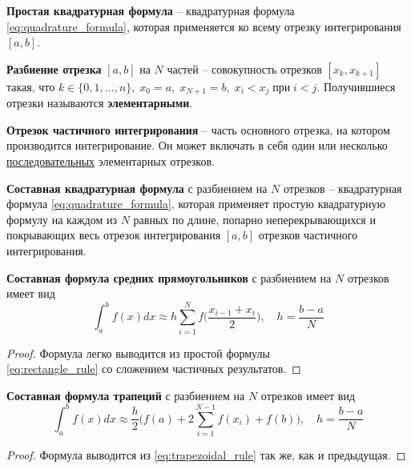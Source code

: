 \documentclass[../main.tex]{subfile}
\begin{document}
\begin{define}
	\textbf{Простая квадратурная формула} -- квадратурная формула
	\eqref{eq:quadrature_formula}, которая применяется ко всему отрезку
	интегрирования $[a,b]$.
\end{define}

\begin{define}
	\textbf{Разбиение отрезка} $[a,b]$ на $N$ частей -- совокупность
	отрезков $[x_k,x_{k+1}]$ такая, что $k\in\{0,1,...,n\},\;x_0=a,\;x_{N+1}
	=b,\;x_i<x_j\;\text{при}\;i<j$. Получившиеся отрезки называются
	\textbf{элементарными}.
\end{define}

\begin{define}
	\textbf{Отрезок частичного интегрирования} -- часть основного отрезка,
	на котором производится интегрирование. Он может включать в себя один
	или несколько \underline{последовательных} элементарных отрезков.
\end{define}

\begin{define}
	\textbf{Составная квадратурная формула} с разбиением на $N$ отрезков --
	квадратурная формула \eqref{eq:quadrature_formula}, которая применяет
	простую квадратурную формулу на каждом из $N$ равных по длине, попарно
	неперекрывающихся и покрывающих весь отрезок интегрирования $[a,b]$
	отрезков частичного интегрирования.
\end{define}
\newpage

\begin{theorem}
	\textbf{Составная формула средних прямоугольников} с разбиением на $N$
	отрезков имеет вид
	\[\boxed{\int_a^b f(x)dx\approx h\sum_{i=1}^{N}f\Big(\frac{x_{i-1}+x_i}
	{2}\Big),\quad h=\frac{b-a}{N}}\]
\end{theorem}

\begin{proof}
	Формула легко выводится из простой формулы \\
	\eqref{eq:rectangle_rule} со сложением частичных результатов.
\end{proof}

\begin{theorem}
	\textbf{Составная формула трапеций} с разбиением на $N$ отрезков имеет вид
	\[\boxed{\int_a^b f(x)dx\approx \frac{h}{2}\Big(f(a)+2\sum_{i=1}^{N-1}
	f(x_i)+f(b)\Big),\quad h=\frac{b-a}{N}}\]
\end{theorem}

\begin{proof}
	Формула выводится из \eqref{eq:trapezoidal_rule} так же, как и
	предыдущая.
\end{proof}
\end{document}
